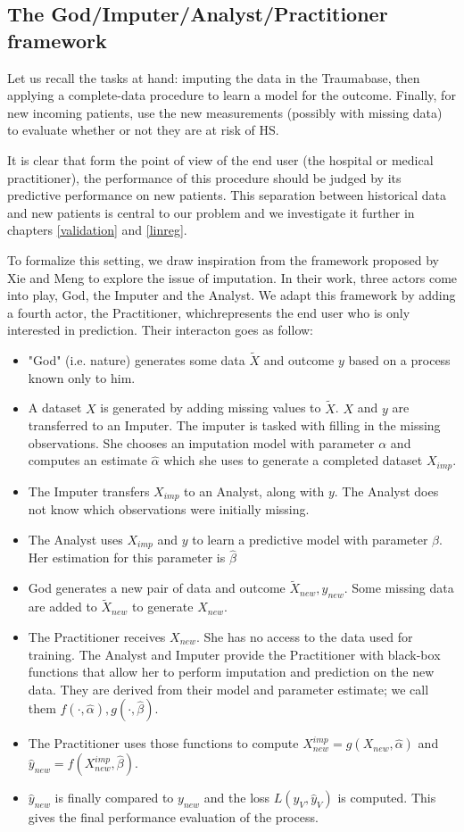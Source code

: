 		\subsection{The God/Imputer/Analyst/Practitioner framework}
		\label{framework}
Let us recall the tasks at hand: imputing the data in the Traumabase, then applying a complete-data procedure to learn a model for the outcome. Finally, for new  incoming patients, use the new measurements (possibly with missing data) to evaluate whether or not they are at risk of HS. 

It is clear that form the point of view of the end user (the hospital or medical practitioner), the performance of this procedure should be judged by its predictive performance on new patients. This separation between historical data and new patients is central to our problem and we investigate it further in chapters \ref{validation} and \ref{linreg}.

To formalize this setting, we draw inspiration from the framework proposed by Xie and Meng \cite{xie_meng} to explore the issue of imputation. In their work, three actors come into play, God, the Imputer and the Analyst. We adapt this framework by adding a fourth actor, the Practitioner, whichrepresents the end user who is only interested in prediction. Their interacton goes as follow:
\begin{itemize}
 \item "God" (i.e. nature) generates some data $\tilde{X}$ and outcome $y$ based on a process known only to him. 
 \item A dataset $X$ is generated by adding missing values to $\tilde{X}$. $X$ and $y$ are transferred to an Imputer. The imputer is tasked with filling in the missing observations. She chooses an imputation model with parameter $\alpha$ and computes an estimate $\hat{\alpha}$ which she uses to generate a completed dataset $X_{imp}$.
 \item  The Imputer transfers $X_{imp}$ to an Analyst, along with $y$. The Analyst does not know which observations were initially missing.
 \item The Analyst uses $X_{imp}$ and $y$ to learn a predictive model with parameter $\beta$. Her estimation for this parameter is $\hat{\beta}$
 \item God generates a new pair of data and outcome $\tilde{X}_{new}, y_{new}$. Some missing data are added to  $\tilde{X}_{new}$ to generate $X_{new}$.
 \item The Practitioner receives $X_{new}$. She has no access to the data used for training. The Analyst and Imputer provide the Practitioner with black-box functions that allow her to perform imputation and prediction on the new data. They are derived from their model and parameter estimate; we call them $f(\cdot,\hat{\alpha}),g(\cdot,\hat{\beta})$.
 \item The Practitioner uses those functions to compute $X_{new}^{imp} = g(X_{new},\hat{\alpha})$ and $\hat{y}_{new}= f(X_{new}^{imp},\hat{\beta})$.
 \item $\hat{y}_{new}$ is finally compared to $y_{new}$ and the loss $L(y_V, \hat{y}_V)$ is computed. This gives the final performance evaluation of the process.
\end{itemize}

